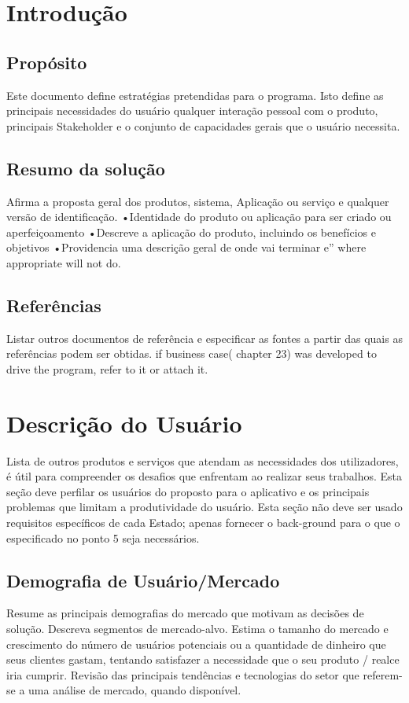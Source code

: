 \begin{apendicesenv}
	\section{Introdução}
		\subsection{Propósito}
Este documento define estratégias pretendidas para o programa. Isto define as principais necessidades do usuário qualquer interação pessoal com o produto, principais Stakeholder e o conjunto de capacidades gerais que o usuário necessita.
		\subsection{Resumo da solução}
Afirma a proposta geral dos produtos, sistema, Aplicação ou serviço e qualquer versão de identificação.
		•Identidade do produto ou aplicação para ser criado ou aperfeiçoamento
		•Descreve a aplicação do produto, incluindo os benefícios e objetivos
		•Providencia uma descrição geral de onde vai terminar e” where appropriate will not do.
		\subsection{Referências}
		Listar outros documentos de referência e especificar as fontes a partir das quais as referências podem ser obtidas. if business case( chapter 23) was developed to drive the program, refer to it or attach it.
	\section{Descrição do Usuário}
Lista de outros produtos e serviços que atendam as necessidades dos utilizadores, é útil para compreender os desafios que enfrentam ao realizar seus trabalhos. Esta seção deve perfilar os usuários do proposto para o  aplicativo e os principais problemas que limitam a produtividade do usuário. Esta seção não deve ser usado requisitos específicos de cada Estado; apenas fornecer o back-ground para o que o especificado no ponto 5 seja necessários.

		\subsection{Demografia de Usuário/Mercado}
Resume as principais demografias do mercado que motivam as decisões de solução. Descreva segmentos de mercado-alvo. Estima o tamanho do mercado e crescimento do número de usuários potenciais ou a quantidade de dinheiro que seus clientes gastam, tentando satisfazer a necessidade que o seu produto / realce iria cumprir. Revisão das principais tendências e tecnologias do setor que referem-se a uma análise de mercado, quando disponível.


\end{apendicesenv}
